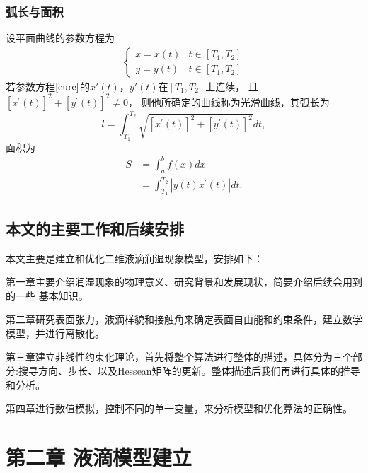 \documentclass[12pt,oneside,a4paper]{article}
\begin{document}
\subsubsection{弧长与面积}
设平面曲线的参数方程为
\begin{align}\label{cure}
\left\{\begin{array}{ll}
x=x(t) & t \in\left[T_{1}, T_{2}\right] \\
y=y(t) & t \in\left[T_{1}, T_{2}\right]
\end{array}\right.
\end{align}
若参数方程$\ref{cure}$的$x'(t)$，$y'(t)$在$[T_{1}, T_{2}]$上连续，
且$\left[x^{\prime}(t)\right]^{2}+\left[y^{\prime}(t)\right]^{2} \neq 0$，
则他所确定的曲线称为光滑曲线，其弧长\cite{chen}为
\begin{equation*}
l=\int_{T_{1}}^{T_{2}} \sqrt{\left[x^{\prime}(t)\right]^{2}+\left[y^{\prime}(t)\right]^{2}} d t,
\end{equation*}
\noindent 面积为
\begin{align*}
S &=\int_{a}^{b} f(x) d x \\
 &=\int_{T_{1}}^{T_{2}}\left|y(t) x^{\prime}(t)\right| d t.
\end{align*}

\subsection{本文的主要工作和后续安排}
本文主要是建立和优化二维液滴润湿现象模型，安排如下：

第一章主要介绍润湿现象的物理意义、研究背景和发展现状，简要介绍后续会用到的一些
基本知识。

第二章研究表面张力，液滴样貌和接触角来确定表面自由能和约束条件，建立数学模型，并进行离散化。

第三章建立非线性约束化理论，首先将整个算法进行整体的描述，具体分为三个部分:搜寻方向、步长、以及Hessean矩阵的更新。整体描述后我们再进行具体的推导和分析。

第四章进行数值模拟，控制不同的单一变量，来分析模型和优化算法的正确性。


\newpage

\section{第二章 液滴模型建立}
\end{document}
